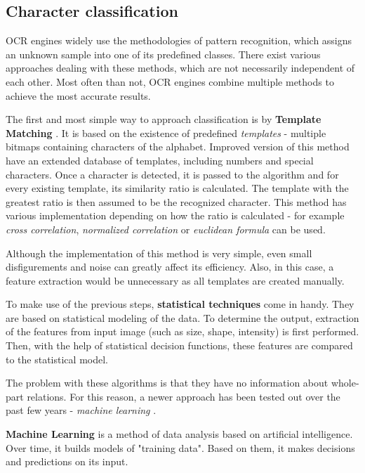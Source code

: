 \subsection{Character classification}

OCR engines widely use the methodologies of pattern recognition, which assigns an unknown sample into one of its predefined classes. There exist various approaches dealing with these methods, which are not necessarily independent of each other. Most often than not, OCR engines combine multiple methods to achieve the most accurate results.

The first and most simple way to approach classification is by \textbf{Template Matching} \citep{templateMatching}. It is based on the existence of predefined \emph{templates} - multiple bitmaps containing characters of the alphabet. Improved version of this method have an extended database of templates, including numbers and special characters. Once a character is detected, it is passed to the algorithm and for every existing template, its similarity ratio is calculated. The template with the greatest ratio is then assumed to be the recognized character. This method has various implementation depending on how the ratio is calculated - for example \emph{cross correlation}, \emph{normalized correlation} or \emph{euclidean formula} can be used.

Although the implementation of this method is very simple, even small disfigurements and noise can greatly affect its efficiency. Also, in this case, a feature extraction would be unnecessary as all templates are created manually.

To make use of the previous steps, \textbf{statistical techniques} \citep{characterClassification} come in handy. They are based on statistical modeling of the data. To determine the output, extraction of the features from input image (such as size, shape, intensity) is first performed. Then, with the help of statistical decision functions, these features are compared to the statistical model.

The problem with these algorithms is that they have no information about whole-part relations. For this reason, a newer approach has been tested out over the past few years - \emph{machine learning} \citep{characterClassification}.

\textbf{Machine Learning} is a method of data analysis based on artificial intelligence. Over time, it builds models of "training data". Based on them, it makes decisions and predictions on its input. 

